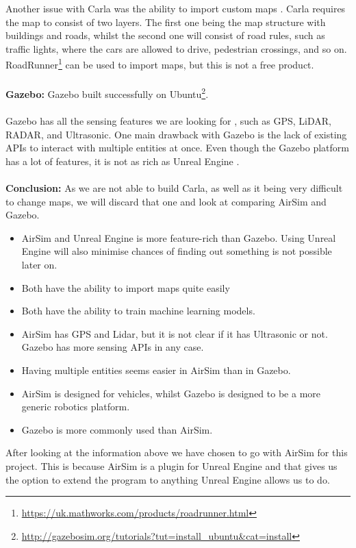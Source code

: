Another issue with Carla was the ability to import custom maps \cite{Carlamap}. Carla requires the map to consist of two layers. The first one being the map structure with buildings and roads, whilst the second one will consist of road rules, such as traffic lights, where the cars are allowed to drive, pedestrian crossings, and so on. RoadRunner\footnote{\url{https://uk.mathworks.com/products/roadrunner.html}} can be used to import maps, but this is not a free product.
\\~\\
\textbf{Gazebo:} Gazebo built successfully on Ubuntu\footnote{\url{http://gazebosim.org/tutorials?tut=install_ubuntu&cat=install}}.
\\~\\
Gazebo has all the sensing features we are looking for \cite{Rosique2019}, such as GPS, LiDAR, RADAR, and Ultrasonic. One main drawback with Gazebo is the lack of existing APIs to interact with multiple entities at once. Even though the Gazebo platform has a lot of features, it is not as rich as Unreal Engine \cite{EbeidEmad2018AsoO}. 
\\~\\

\textbf{Conclusion:} As we are not able to build Carla, as well as it being very difficult to change maps, we will discard that one and look at comparing AirSim and Gazebo. 
\begin{itemize}
    \item AirSim and Unreal Engine is more feature-rich than Gazebo. Using Unreal Engine will also minimise chances of finding out something is not possible later on.
    \item Both have the ability to import maps quite easily
    \item Both have the ability to train machine learning models.
    \item AirSim has GPS and Lidar, but it is not clear if it has Ultrasonic or not. Gazebo has more sensing APIs in any case.
    \item Having multiple entities seems easier in AirSim than in Gazebo. 
    \item AirSim is designed for vehicles, whilst Gazebo is designed to be a more generic robotics platform. 
    \item Gazebo is more commonly used than AirSim. 
\end{itemize}
After looking at the information above we have chosen to go with AirSim for this project. This is because AirSim is a plugin for Unreal Engine and that gives us the option to extend the program to anything Unreal Engine allows us to do. 